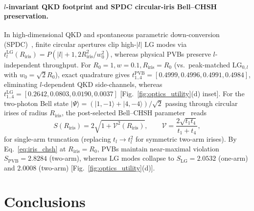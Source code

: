 \documentclass[aps,pra,onecolumn,notitlepage,11pt,tightenlines,amsmath,amssymb,floatfix,longbibliography]{revtex4-2}
\providecommand{\ket}[1]{\lvert#1\rangle}
\providecommand{\abs}[1]{\lvert#1\rvert}
\begin{document}
\paragraph*{$l$-invariant QKD footprint and SPDC circular-iris Bell--CHSH preservation.}
In high-dimensional QKD and spontaneous parametric down-conversion (SPDC)~\cite{Cerf2002,LawEberly2004,Walborn2010,Mirhosseini2015}, finite circular apertures clip high-$\abs{l}$ LG modes via $t_l^{\mathrm{LG}}(R_{\mathrm{iris}}) = P(\abs{l}+1, 2R_{\mathrm{iris}}^2/w_0^2)$, whereas physical PVBs preserve $l$-independent throughput. For $R_0 = 1, w = 0.1, R_{\mathrm{iris}} = R_0$ (vs.\ peak-matched $\mathrm{LG}_{0,l}$ with $w_0 = \sqrt{2}R_0$), exact quadrature gives $t_{1..4}^{\mathrm{PVB}} = [0.4999, 0.4996, 0.4991, 0.4984]$, eliminating $l$-dependent QKD side-channels, whereas $t_{1..4}^{\mathrm{LG}} = [0.2642, 0.0803, 0.0190, 0.0037]$ [Fig.~\ref{fig:optics_utility}(d) inset]. For the two-photon Bell state $\ket{\Psi} = (\ket{1,-1} + \ket{4,-4})/\sqrt{2}$ passing through circular irises of radius $R_{\mathrm{iris}}$, the post-selected Bell--CHSH parameter~\cite{Clauser1969} reads
\begin{equation}
S(R_{\mathrm{iris}}) = 2\sqrt{1 + \mathcal{V}^2(R_{\mathrm{iris}})}, \qquad \mathcal{V} = \frac{2\sqrt{t_1 t_4}}{t_1 + t_4},
\label{eq:iris_chsh}
\end{equation}
for single-arm truncation (replacing $t_l \to t_l^2$ for symmetric two-arm irises). By Eq.~\eqref{eq:iris_chsh} at $R_{\mathrm{iris}} = R_0$, PVBs maintain near-maximal violation $S_{\mathrm{PVB}} = 2.8284$ (two-arm), whereas LG modes collapse to $S_{\mathrm{LG}} = 2.0532$ (one-arm) and $2.0008$ (two-arm) [Fig.~\ref{fig:optics_utility}(d)].

\section{Conclusions}
\label{sec:conclusions}
\end{document}
